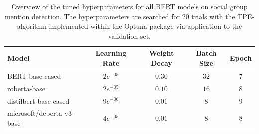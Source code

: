 \begin{table}[H]
\centering
\begin{tabular}{lcccc}
\toprule
Model & Learning Rate & Weight Decay & Batch Size & Epoch \\
\midrule
BERT-base-cased & $2e^{-05}$ & $0.30$ & $32$ & $7$ \\
roberta-base & $2e^{-05}$ & $0.10$ & $16$ & $8$ \\
distilbert-base-cased & $9e^{-06}$ & $0.01$ & $8$ & $9$ \\
microsoft/deberta-v3-base & $4e^{-05}$ & $0.01$ & $8$ & $8$ \\
\bottomrule
\end{tabular}
\caption[Tuned hyperparameters for BERT models on social group mention detection]{Overview of the tuned hyperparameters for all BERT models on social group mention detection. The hyperparameters are searched for $20$ trials with the TPE-algorithm implemented within the Optuna package \parencite{akiba_optuna_2019} via application to the validation set.}
\label{tab:tuned_hyperparams_bert_group_detection}
\end{table}